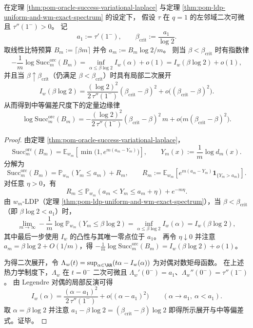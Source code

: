 
\begin{corollary}[外置预算临界点的二次边缘律与中等偏差尺度]\label{cor:pom-oracle-critical-quadratic-marginal-law}
在定理 \ref{thm:pom-oracle-success-variational-laplace} 与定理 \ref{thm:pom-ldp-uniform-and-wm-exact-spectrum} 的设定下，
假设 \(\tau\) 在 \(q=1\) 的左邻域二次可微且 \(\tau''(1^-)>0\)。
记
\[
a_1:=\tau'(1^-),\qquad
\beta_{\mathrm{crit}}:=\frac{a_1}{\log 2}.
\]
取线性比特预算 \(B_m:=\lceil \beta m\rceil\) 并令 \(a_m:=B_m\log 2/m\)。
则当 \(\beta<\beta_{\mathrm{crit}}\) 时有指数律
\[
-\frac{1}{m}\log \mathrm{Succ}^{\mathrm{orc}}_m(B_m)
=\inf_{\alpha\le \beta\log 2}I_w(\alpha)+o(1)
=I_w(\beta\log 2)+o(1),
\]
并且当 \(\beta\uparrow\beta_{\mathrm{crit}}\)（仍满足 \(\beta<\beta_{\mathrm{crit}}\)）时具有局部二次展开
\[
I_w(\beta\log 2)
=\frac{(\log 2)^2}{2\,\tau''(1^-)}(\beta_{\mathrm{crit}}-\beta)^2
+o\!\bigl((\beta_{\mathrm{crit}}-\beta)^2\bigr).
\]
从而得到中等偏差尺度下的定量边缘律
\[
\log \mathrm{Succ}^{\mathrm{orc}}_m(B_m)
=-\frac{(\log 2)^2}{2\,\tau''(1^-)}(\beta_{\mathrm{crit}}-\beta)^2\,m
+o\!\bigl(m(\beta_{\mathrm{crit}}-\beta)^2\bigr).
\]
\end{corollary}

\begin{proof}
由定理 \ref{thm:pom-oracle-success-variational-laplace}，
\[
\mathrm{Succ}^{\mathrm{orc}}_m(B_m)
=\mathbb{E}_{w_m}\!\left[\min\bigl(1,e^{m(a_m-Y_m)}\bigr)\right],
\qquad
Y_m(x):=\frac{1}{m}\log d_m(x).
\]
分解为
\[
\mathrm{Succ}^{\mathrm{orc}}_m(B_m)=\mathbb{P}_{w_m}(Y_m\le a_m)+R_m,
\qquad
R_m:=\mathbb{E}_{w_m}\!\left[e^{m(a_m-Y_m)}\mathbf 1_{\{Y_m>a_m\}}\right].
\]
对任意 \(\eta>0\)，有
\[
R_m\le \mathbb{P}_{w_m}\!\left(a_m<Y_m\le a_m+\eta\right)+e^{-m\eta}.
\]
由 \(w_m\)-LDP（定理 \ref{thm:pom-ldp-uniform-and-wm-exact-spectrum}），当 \(\beta<\beta_{\mathrm{crit}}\)（即 \(\beta\log 2<a_1\)）时，
\[
\lim_{m\to\infty}-\frac{1}{m}\log \mathbb{P}_{w_m}(Y_m\le \beta\log 2)
=\inf_{\alpha\le \beta\log 2}I_w(\alpha)
=I_w(\beta\log 2),
\]
其中最后一步使用 \(I_w\) 的凸性与其唯一零点位于 \(a_1\)。
再令 \(\eta\downarrow 0\) 并注意 \(a_m=\beta\log 2+O(1/m)\)，得
\(-\frac{1}{m}\log \mathrm{Succ}^{\mathrm{orc}}_m(B_m)=I_w(\beta\log 2)+o(1)\)。
\par
为得二次展开，令 \(\Lambda_w(t)=\sup_{\alpha\in\RR}(t\alpha-I_w(\alpha))\) 为对偶对数矩母函数。
在上述热力学制度下，\(\Lambda_w\) 在 \(t=0^-\) 二次可微且
\(\Lambda_w'(0^-)=a_1\)、\(\Lambda_w''(0^-)=\tau''(1^-)\)。
由 Legendre 对偶的局部反演可得
\[
I_w(\alpha)=\frac{(\alpha-a_1)^2}{2\,\tau''(1^-)}+o\!\bigl((\alpha-a_1)^2\bigr)
\qquad(\alpha\to a_1,\ \alpha<a_1).
\]
取 \(\alpha=\beta\log 2\) 并注意 \(a_1-\beta\log 2=(\beta_{\mathrm{crit}}-\beta)\log 2\) 即得所示展开与中等偏差式。证毕。
\end{proof}
